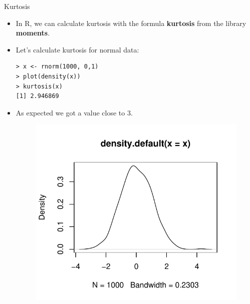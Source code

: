 \documentclass[handout]{beamer}
\begin{document}
\begin{frame}[fragile]{Kurtosis}

\scriptsize{
\begin{itemize} 
 \item In R, we can calculate kurtosis with the formula \textbf{kurtosis} from the library \textbf{moments}.
 
 \item Let's calculate kurtosis for normal data:
 
 \begin{verbatim}
> x <- rnorm(1000, 0,1)
> plot(density(x))
> kurtosis(x)
[1] 2.946869
 \end{verbatim}

 \item  As expected we got a value close to 3.

 
   \begin{figure}[h!]
	\centering
	\includegraphics[scale=0.4]{pics/kurt1.pdf}
	\end{figure} 
 
 
 
\end{itemize}

}

 
\end{frame}
\end{document}
